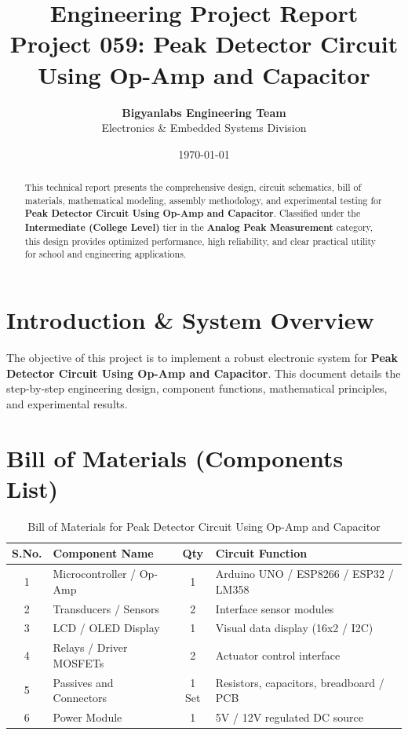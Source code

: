 \documentclass[11pt,a4paper]{article}
\title{\textbf{\Huge Engineering Project Report}\\[0.5em] \Large Project 059: Peak Detector Circuit Using Op-Amp and Capacitor}
\author{\textbf{Bigyanlabs Engineering Team}\\ Electronics \& Embedded Systems Division}
\date{\today}
\begin{document}
\maketitle
\thispagestyle{empty}

\begin{abstract}
This technical report presents the comprehensive design, circuit schematics, bill of materials, mathematical modeling, assembly methodology, and experimental testing for \textbf{Peak Detector Circuit Using Op-Amp and Capacitor}. Classified under the \textbf{Intermediate (College Level)} tier in the \textbf{Analog Peak Measurement} category, this design provides optimized performance, high reliability, and clear practical utility for school and engineering applications.
\end{abstract}

\newpage
\tableofcontents
\newpage

\section{Introduction \& System Overview}
The objective of this project is to implement a robust electronic system for \textbf{Peak Detector Circuit Using Op-Amp and Capacitor}. This document details the step-by-step engineering design, component functions, mathematical principles, and experimental results.

\section{Bill of Materials (Components List)}
\begin{table}[h!]
\centering
\caption{Bill of Materials for Peak Detector Circuit Using Op-Amp and Capacitor}
\vspace{0.5em}
\begin{tabular}{clcp{7cm}}
\toprule
\textbf{S.No.} & \textbf{Component Name} & \textbf{Qty} & \textbf{Circuit Function} \\
\midrule
1 & Microcontroller / Op-Amp & 1 & Arduino UNO / ESP8266 / ESP32 / LM358 \\
2 & Transducers / Sensors & 2 & Interface sensor modules \\
3 & LCD / OLED Display & 1 & Visual data display (16x2 / I2C) \\
4 & Relays / Driver MOSFETs & 2 & Actuator control interface \\
5 & Passives and Connectors & 1 Set & Resistors, capacitors, breadboard / PCB \\
6 & Power Module & 1 & 5V / 12V regulated DC source \\
\bottomrule
\end{tabular}
\end{table}
\end{document}
